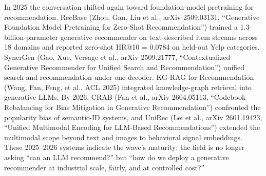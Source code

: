 In 2025 the conversation shifted again toward foundation-model pretraining for recommendation. RecBase (Zhou, Gan, Liu et al., arXiv 2509.03131, ``Generative Foundation Model Pretraining for Zero-Shot Recommendation'') trained a 1.3-billion-parameter generative recommender on text-described item streams across 18 domains and reported zero-shot HR@10 = 0.0784 on held-out Yelp categories. SynerGen (Gao, Xue, Versage et al., arXiv 2509.21777, ``Contextualized Generative Recommender for Unified Search and Recommendation'') unified search and recommendation under one decoder. KG-RAG for Recommendation (Wang, Fan, Feng, et al., ACL 2025) integrated knowledge-graph retrieval into generative LLMs. By 2026, CRAB (Fan et al., arXiv 2604.05113, ``Codebook Rebalancing for Bias Mitigation in Generative Recommendation'') confronted the popularity bias of semantic-ID systems, and UniRec (Lei et al., arXiv 2601.19423, ``Unified Multimodal Encoding for LLM-Based Recommendations'') extended the multimodal scope beyond text and images to behavioral signal embeddings. These 2025--2026 systems indicate the wave's maturity: the field is no longer asking ``can an LLM recommend?'' but ``how do we deploy a generative recommender at industrial scale, fairly, and at controlled cost?''

